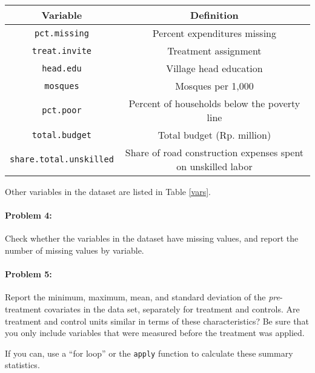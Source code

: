 \documentclass{article}
\begin{document}
\begin{table*}[h]
  \caption{Variables \label{vars}}
  \centering
  \begin{tabular}{c|c}
    \hline \textbf{Variable} & \textbf{Definition}\\ \hline
    \texttt{pct.missing} & Percent expenditures missing\\
    \texttt{treat.invite} & Treatment assignment \\ 
    \texttt{head.edu} & Village head education \\
    \texttt{mosques} & Mosques per 1,000 \\
    \texttt{pct.poor} & Percent of households below the poverty line\\
    \texttt{total.budget} & Total budget (Rp. million)\\
    \texttt{share.total.unskilled} & Share of road construction expenses spent on
    unskilled labor
  \end{tabular}
\end{table*}
Other variables in the dataset are listed in Table \ref{vars}. 


\paragraph{Problem 4:}
Check whether the variables in the dataset have missing values, and
report the number of missing values by variable. 

\paragraph{Problem 5:}
Report the minimum, maximum, mean, and standard deviation of the
\textit{pre}-treatment covariates in the data set, separately for treatment and
controls.  Are treatment and control units similar in terms of these
characteristics? Be sure that you only include variables that were
measured before the treatment was applied. 

If you can, use a ``for loop'' or the \texttt{apply}
function to calculate these summary statistics. 
\end{document}
